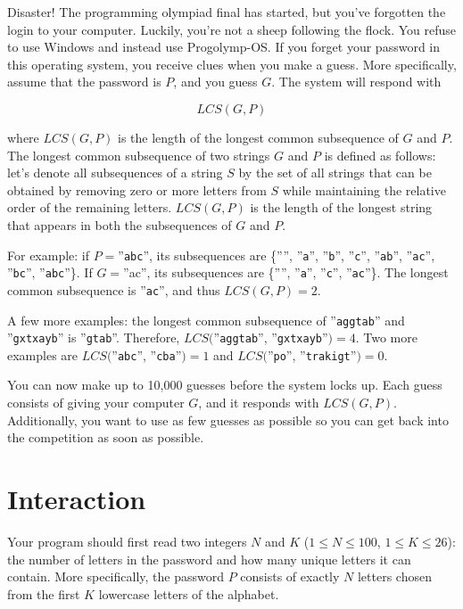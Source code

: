 
Disaster! The programming olympiad final has started, but you've forgotten the login to your computer.
Luckily, you're not a sheep following the flock. You refuse to use Windows and instead use Progolymp-OS.
If you forget your password in this operating system, you receive clues when you make a guess.
More specifically, assume that the password is $P$, and you guess $G$. The system will respond with

$$LCS(G,P)$$

where $LCS(G,P)$ is the length of the longest common subsequence of $G$ and $P$. The longest common
subsequence of two strings $G$ and $P$ is defined as follows: let's denote all subsequences of
a string $S$ by the set of all strings that can be obtained by removing zero or more letters
from $S$ while maintaining the relative order of the remaining letters. $LCS(G,P)$ is the length of the longest
string that appears in both the subsequences of $G$ and $P$.

For example: if $P=$''\texttt{abc}'', its subsequences are \{'''', ''\texttt{a}'', ''\texttt{b}'', ''\texttt{c}'',
''\texttt{ab}'', ''\texttt{ac}'', ''\texttt{bc}'', ''\texttt{abc}''\}.
If $G=$''ac'', its subsequences are \{'''', ''\texttt{a}'', ''\texttt{c}'', ''\texttt{ac}''\}. The longest common subsequence
is ''\texttt{ac}'', and thus $LCS(G,P)=2$.

A few more examples: the longest common subsequence of ''\texttt{aggtab}'' and ''\texttt{gxtxayb}'' is ''\texttt{gtab}''. Therefore,
$LCS($''\texttt{aggtab}'', ''\texttt{gxtxayb}''$) = 4$. Two more examples are $LCS($''\texttt{abc}'', ''\texttt{cba}''$) = 1$ and 
$LCS($''\texttt{po}'', ''\texttt{trakigt}''$) = 0$.

You can now make up to 10,000 guesses before the system locks up. Each guess consists of giving your computer $G$, and it
responds with $LCS(G,P)$. Additionally, you want to use as few guesses as possible so you can get back into the competition as soon as possible.

\section*{Interaction}
Your program should first read two integers $N$ and $K$ ($1 \leq N \leq 100$, $1 \leq K \leq 26$): the number of letters in the password and
how many unique letters it can contain.
More specifically, the password $P$ consists of exactly $N$ letters chosen from the first $K$ lowercase letters of the alphabet.


